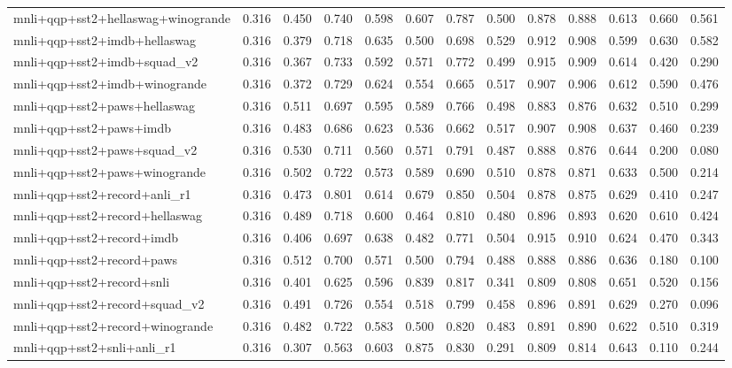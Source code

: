 \begin{table}[t]
\begin{tabular}{lrrrrrrrrrrrr}
    mnli+qqp+sst2+hellaswag+winogrande & 0.316 & 0.450 & 0.740 & 0.598 & 0.607 & 0.787 & 0.500 & 0.878 & 0.888 & 0.613 & 0.660 & 0.561 \\
    mnli+qqp+sst2+imdb+hellaswag & 0.316 & 0.379 & 0.718 & 0.635 & 0.500 & 0.698 & 0.529 & 0.912 & 0.908 & 0.599 & 0.630 & 0.582 \\
    mnli+qqp+sst2+imdb+squad\_v2 & 0.316 & 0.367 & 0.733 & 0.592 & 0.571 & 0.772 & 0.499 & 0.915 & 0.909 & 0.614 & 0.420 & 0.290 \\
    mnli+qqp+sst2+imdb+winogrande & 0.316 & 0.372 & 0.729 & 0.624 & 0.554 & 0.665 & 0.517 & 0.907 & 0.906 & 0.612 & 0.590 & 0.476 \\
    mnli+qqp+sst2+paws+hellaswag & 0.316 & 0.511 & 0.697 & 0.595 & 0.589 & 0.766 & 0.498 & 0.883 & 0.876 & 0.632 & 0.510 & 0.299 \\
    mnli+qqp+sst2+paws+imdb & 0.316 & 0.483 & 0.686 & 0.623 & 0.536 & 0.662 & 0.517 & 0.907 & 0.908 & 0.637 & 0.460 & 0.239 \\
    mnli+qqp+sst2+paws+squad\_v2 & 0.316 & 0.530 & 0.711 & 0.560 & 0.571 & 0.791 & 0.487 & 0.888 & 0.876 & 0.644 & 0.200 & 0.080 \\
    mnli+qqp+sst2+paws+winogrande & 0.316 & 0.502 & 0.722 & 0.573 & 0.589 & 0.690 & 0.510 & 0.878 & 0.871 & 0.633 & 0.500 & 0.214 \\
    mnli+qqp+sst2+record+anli\_r1 & 0.316 & 0.473 & 0.801 & 0.614 & 0.679 & 0.850 & 0.504 & 0.878 & 0.875 & 0.629 & 0.410 & 0.247 \\
    mnli+qqp+sst2+record+hellaswag & 0.316 & 0.489 & 0.718 & 0.600 & 0.464 & 0.810 & 0.480 & 0.896 & 0.893 & 0.620 & 0.610 & 0.424 \\
    mnli+qqp+sst2+record+imdb & 0.316 & 0.406 & 0.697 & 0.638 & 0.482 & 0.771 & 0.504 & 0.915 & 0.910 & 0.624 & 0.470 & 0.343 \\
    mnli+qqp+sst2+record+paws & 0.316 & 0.512 & 0.700 & 0.571 & 0.500 & 0.794 & 0.488 & 0.888 & 0.886 & 0.636 & 0.180 & 0.100 \\
    mnli+qqp+sst2+record+snli & 0.316 & 0.401 & 0.625 & 0.596 & 0.839 & 0.817 & 0.341 & 0.809 & 0.808 & 0.651 & 0.520 & 0.156 \\
    mnli+qqp+sst2+record+squad\_v2 & 0.316 & 0.491 & 0.726 & 0.554 & 0.518 & 0.799 & 0.458 & 0.896 & 0.891 & 0.629 & 0.270 & 0.096 \\
    mnli+qqp+sst2+record+winogrande & 0.316 & 0.482 & 0.722 & 0.583 & 0.500 & 0.820 & 0.483 & 0.891 & 0.890 & 0.622 & 0.510 & 0.319 \\
    mnli+qqp+sst2+snli+anli\_r1 & 0.316 & 0.307 & 0.563 & 0.603 & 0.875 & 0.830 & 0.291 & 0.809 & 0.814 & 0.643 & 0.110 & 0.244 \\

\end{tabular}
\end{table}

